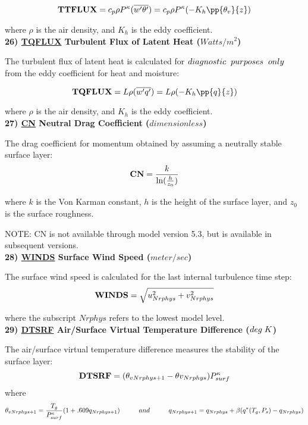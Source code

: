 \noindent
\[
{\bf TTFLUX} = c_p {\rho }  
P^{\kappa}{(\overline{w^{\prime}\theta^{\prime}})}
 = c_p  {\rho } P^{\kappa}{(- K_h \pp{\theta_v}{z})}
\]
 
\noindent
where $\rho$ is the air density, and $K_h$ is the eddy coefficient.
\\


\noindent
{\bf 26)  \underline {TQFLUX}  Turbulent Flux of Latent Heat ($Watts/m^2$) }

\noindent
The turbulent flux of latent heat is calculated for $diagnostic \hspace{.2cm} purposes 
\hspace{.2cm} only$ from the eddy coefficient for heat and moisture:

\noindent
\[
{\bf TQFLUX} = {L {\rho } (\overline{w^{\prime}q^{\prime}})} = 
{L {\rho }(- K_h \pp{q}{z})}
\]
 
\noindent
where $\rho$ is the air density, and $K_h$ is the eddy coefficient.
\\

 
\noindent
{\bf 27)  \underline {CN}  Neutral Drag Coefficient ($dimensionless$) }

\noindent
The drag coefficient for momentum obtained by assuming a neutrally stable surface layer:
\[
{\bf CN} = { k \over { \ln({h \over {z_0}})} }
\]

\noindent
where $k$ is the Von Karman constant, $h$ is the height of the surface layer, and
$z_0$ is the surface roughness. 

\noindent
NOTE: CN is not available through model version 5.3, but is available in subsequent
versions.
\\

\noindent
{\bf 28)  \underline {WINDS}  Surface Wind Speed ($meter/sec$) }

\noindent
The surface wind speed is calculated for the last internal turbulence time step:
\[
{\bf WINDS} = \sqrt{u_{Nrphys}^2 + v_{Nrphys}^2}
\]

\noindent
where the subscript $Nrphys$ refers to the lowest model level.
\\
 
\noindent
{\bf 29)  \underline {DTSRF}  Air/Surface Virtual Temperature Difference ($deg \hspace{.1cm} K$) }

\noindent
The air/surface virtual temperature difference measures the stability of the surface layer:
\[
{\bf DTSRF} = (\theta_{v{Nrphys+1}} - \theta{v_{Nrphys}}) P^{\kappa}_{surf}
\]
\noindent
where
\[
\theta_{v{Nrphys+1}} = { T_g \over {P^{\kappa}_{surf}} } (1 + .609 q_{Nrphys+1}) \hspace{1cm}
and \hspace{1cm} q_{Nrphys+1} = q_{Nrphys} + \beta(q^*(T_g,P_s) - q_{Nrphys})
\]

